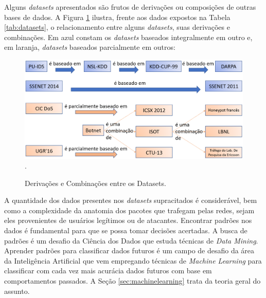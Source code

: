 Alguns \textit{datasets} apresentados são frutos de derivações ou composições de outras bases de dados. A Figura \ref{fig:datasets_comparacoes} ilustra, frente aos dados expostos na Tabela \ref{tab:datasets}, o relacionamento entre alguns \textit{datasets}, suas derivações e combinações. Em azul constam os \textit{datasets} baseados integralmente em outro e, em laranja, \textit{datasets} baseados parcialmente em outros:

\begin{figure}[H]
\centering
\caption{Derivações e Combinações entre os Datasets.} \includegraphics[width=16cm,height=\textwidth,keepaspectratio]{figs/datasets_combinacoes_derivacoes.png}
\newline {}.\label{fig:datasets_comparacoes}
\end{figure}


A quantidade dos dados presentes nos \textit{datasets} supracitados é considerável, bem como a complexidade da anatomia dos pacotes que trafegam pelas redes, sejam eles provenientes de usuários legítimos ou de atacantes. Encontrar padrões nos dados é fundamental para que se possa tomar decisões acertadas. A busca de padrões é um desafio da Ciência dos Dados que estuda técnicas de \textit{Data Mining}. Aprender padrões para classificar dados futuros é um campo de desafio da área da Inteligência Artificial que vem empregando técnicas de \textit{Machine Learning} para classificar com cada vez mais acurácia dados futuros com base em comportamentos passados. A Seção \ref{sec:machinelearning} trata da teoria geral do assunto.




